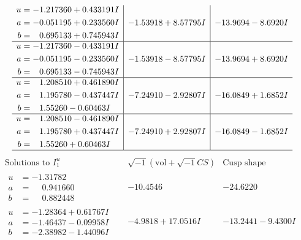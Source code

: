 \documentclass[1p]{elsarticle_modified}
\theoremstyle{definition}
\newcommand{\I}{\sqrt{-1}}
\begin{document}
$$\begin{array}{c|c|c}
\begin{aligned}
u &= -1.217360 + 0.433191 I \\
a &= -0.051195 + 0.233560 I \\
b &= \phantom{-}0.695133 + 0.745943 I\end{aligned}
 & -1.53918 + 8.57795 I & -13.9694 - 8.6920 I \\ \hline\begin{aligned}
u &= -1.217360 - 0.433191 I \\
a &= -0.051195 - 0.233560 I \\
b &= \phantom{-}0.695133 - 0.745943 I\end{aligned}
 & -1.53918 - 8.57795 I & -13.9694 + 8.6920 I \\ \hline\begin{aligned}
u &= \phantom{-}1.208510 + 0.461890 I \\
a &= \phantom{-}1.195780 - 0.437447 I \\
b &= \phantom{-}1.55260 - 0.60463 I\end{aligned}
 & -7.24910 - 2.92807 I & -16.0849 + 1.6852 I \\ \hline\begin{aligned}
u &= \phantom{-}1.208510 - 0.461890 I \\
a &= \phantom{-}1.195780 + 0.437447 I \\
b &= \phantom{-}1.55260 + 0.60463 I\end{aligned}
 & -7.24910 + 2.92807 I & -16.0849 - 1.6852 I\\
 \hline 
 \end{array}$$\newpage$$\begin{array}{c|c|c}  
\text{Solutions to }I^u_{1}& \I (\text{vol} + \sqrt{-1}CS) & \text{Cusp shape}\\
 \hline 
\begin{aligned}
u &= -1.31782\phantom{ +0.000000I} \\
a &= \phantom{-}0.941660\phantom{ +0.000000I} \\
b &= \phantom{-}0.882448\phantom{ +0.000000I}\end{aligned}
 & -10.4546\phantom{ +0.000000I} & -24.6220\phantom{ +0.000000I} \\ \hline\begin{aligned}
u &= -1.28364 + 0.61767 I \\
a &= -1.46437 - 0.09958 I \\
b &= -2.38982 - 1.44096 I\end{aligned}
 & -4.9818 + 17.0516 I & -13.2441 - 9.4300 I \\ \hline\begin{aligned}

\end{aligned}
\end{array}$$
\end{document}
